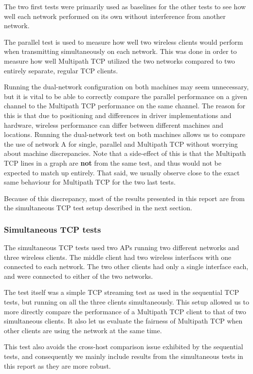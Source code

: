 The two first tests were primarily used as baselines for the other tests to see
how well each network performed on its own without interference from another
network.

The parallel test is used to measure how well two wireless clients would perform
when transmitting simultaneously on each network. This was done in order to
measure how well Multipath TCP utilized the two networks compared to two
entirely separate, regular TCP clients.

Running the dual-network configuration on both machines may seem unnecessary,
but it is vital to be able to correctly compare the parallel performance on a
given channel to the Multipath TCP performance on the same channel. The reason
for this is that due to positioning and differences in driver implementations
and hardware, wireless performance can differ between different machines and
locations. Running the dual-network test on both machines allows us to compare
the use of network A for single, parallel and Multipath TCP without worrying
about machine discrepancies. Note that a side-effect of this is that the
Multipath TCP lines in a graph are \textbf{not} from the same test, and thus
would not be expected to match up entirely. That said, we usually observe close
to the exact same behaviour for Multipath TCP for the two last tests.

Because of this discrepancy, most of the results presented in this report are
from the simultaneous TCP test setup described in the next section.

\subsubsection{Simultaneous TCP tests}
\label{sec:met:setups:simtcp}
The simultaneous TCP tests used two APs running two different networks and three
wireless clients. The middle client had two wireless interfaces with one
connected to each network. The two other clients had only a single interface
each, and were connected to either of the two networks.

The test itself was a simple TCP streaming test as used in the sequential TCP
tests, but running on all the three clients simultaneously. This setup allowed
us to more directly compare the performance of a Multipath TCP client to that of
two simultaneous clients. It also let us evaluate the fairness of Multipath TCP
when other clients are using the network at the same time.

This test also avoids the cross-host comparison issue exhibited by the
sequential tests, and consequently we mainly include results from the
simultaneous tests in this report as they are more robust.

